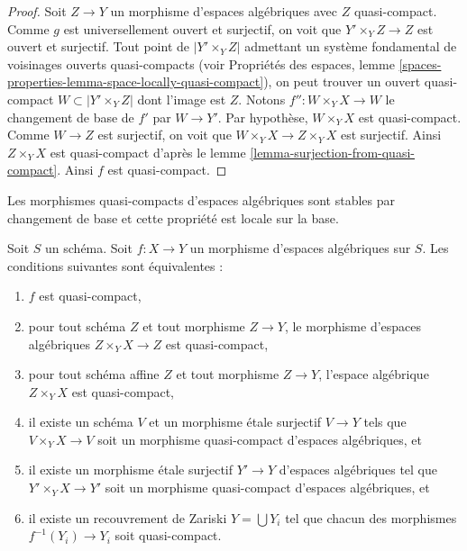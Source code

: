 \begin{proof}
Soit $Z \to Y$ un morphisme d'espaces algébriques avec $Z$ quasi-compact.
Comme $g$ est universellement ouvert et surjectif, on voit que
$Y' \times_Y Z \to Z$ est ouvert et surjectif. Tout point de
$|Y' \times_Y Z|$ admettant un système fondamental de voisinages ouverts
quasi-compacts (voir
Propriétés des espaces,
lemme \ref{spaces-properties-lemma-space-locally-quasi-compact}),
on peut trouver un ouvert quasi-compact $W \subset |Y' \times_Y Z|$
dont l'image est $Z$. Notons
$f'' : W \times_Y X \to W$ le changement de base de $f'$ par $W \to Y'$.
Par hypothèse, $W \times_Y X$ est quasi-compact. Comme $W \to Z$ est surjectif,
on voit que $W \times_Y X \to Z \times_Y X$ est surjectif.
Ainsi $Z \times_Y X$ est quasi-compact d'après le
lemme \ref{lemma-surjection-from-quasi-compact}.
Ainsi $f$ est quasi-compact.
\end{proof}

\begin{lemma}
\label{lemma-quasi-compact-local}
\begin{slogan}
Les morphismes quasi-compacts d'espaces algébriques sont stables par
changement de base et cette propriété est locale sur la base.
\end{slogan}
Soit $S$ un schéma.
Soit $f : X \to Y$ un morphisme d'espaces algébriques sur $S$.
Les conditions suivantes sont équivalentes :
\begin{enumerate}
\item $f$ est quasi-compact,
\item pour tout schéma $Z$ et tout morphisme $Z \to Y$, le morphisme
d'espaces algébriques $Z \times_Y X \to Z$ est quasi-compact,
\item pour tout schéma affine $Z$ et tout morphisme
$Z \to Y$, l'espace algébrique $Z \times_Y X$ est quasi-compact,
\item il existe un schéma $V$ et un morphisme \'etale surjectif
$V \to Y$ tels que $V \times_Y X \to V$ soit un morphisme quasi-compact
d'espaces algébriques, et
\item il existe un morphisme \'etale surjectif
$Y' \to Y$ d'espaces algébriques tel que $Y' \times_Y X \to Y'$
soit un morphisme quasi-compact d'espaces algébriques, et
\item il existe un recouvrement de Zariski $Y = \bigcup Y_i$ tel que
chacun des morphismes $f^{-1}(Y_i) \to Y_i$ soit quasi-compact.
\end{enumerate}
\end{lemma}

